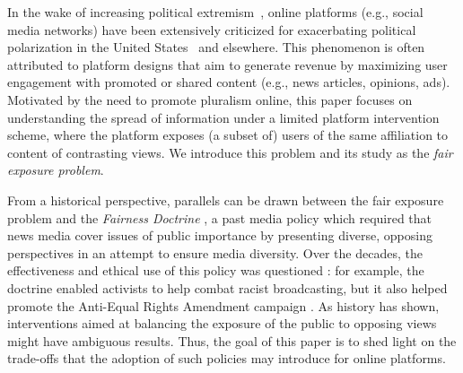 \documentclass[letterpaper]{article} %
\begin{document}
In the wake of increasing political extremism~\citep{doj2021riots}, online platforms (e.g., social media networks) have been extensively criticized for exacerbating political polarization in the United States~\citep{boxell2017internet,Bail9216,hawdon2020social,Yarchi2020PoliticalPO} and elsewhere.
%
This phenomenon is often attributed to platform designs that aim to generate revenue by maximizing user engagement with promoted or shared content (e.g., news articles, opinions, ads).
%
Motivated by the need to promote pluralism online, this paper focuses on understanding the spread of information under a limited platform intervention scheme, where the platform exposes (a subset of) users of the same affiliation to content of contrasting views.
%
We introduce this problem and its study as the \textit{fair exposure problem}.

From a historical perspective, parallels can be drawn between the fair exposure problem and the \textit{Fairness Doctrine} \citep{NYT_FairnessDoctrine_2021, WP_FairnessDoctrine_2021}, a past media policy which required that news media cover issues of public importance by presenting diverse, opposing perspectives in an attempt to ensure media diversity.
%
Over the decades, the effectiveness and ethical use of this policy was questioned \citep{WP_FairnessDoctrine_2021}: for example, the doctrine enabled activists to help combat racist broadcasting, but it also helped promote the Anti-Equal Rights Amendment campaign \citep{WP_FairnessDoctrine_2021}.
%
As  history has shown, interventions aimed at balancing the exposure of the public to opposing views might have ambiguous results.
%
Thus, the goal of this paper is to shed light on the trade-offs that the adoption of such policies may introduce for online platforms.
\end{document}
